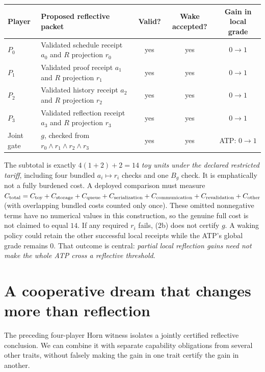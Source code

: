 \documentclass[11pt,letterpaper]{article}
\theoremstyle{definition}
\theoremstyle{plain}
\theoremstyle{definition}
\begin{document}
\begin{center}\small
\begin{tabularx}{\linewidth}{@{}lXccc@{}}\toprule
Player & Proposed reflective packet & Valid? & Wake accepted? & Gain in local grade\\\midrule
$P_0$ & Validated schedule receipt $a_0$ and $R$ projection $r_0$ & yes & yes & $0\to1$\\
$P_1$ & Validated proof receipt $a_1$ and $R$ projection $r_1$ & yes & yes & $0\to1$\\
$P_2$ & Validated history receipt $a_2$ and $R$ projection $r_2$ & yes & yes & $0\to1$\\
$P_3$ & Validated reflection receipt $a_3$ and $R$ projection $r_3$ & yes & yes & $0\to1$\\
Joint gate & $g$, checked from $r_0\wedge r_1\wedge r_2\wedge r_3$ & yes & yes & ATP: $0\to1$\\\bottomrule
\end{tabularx}
\end{center}

The subtotal is exactly $4(1+2)+2=14$ \emph{toy units under the declared restricted tariff}, including four bundled $a_i\mapsto r_i$ checks and one $B_g$ check. It is emphatically not a fully burdened cost. A deployed comparison must measure $C_{\rm total}=C_{\rm toy}+C_{\rm storage}+C_{\rm queue}+C_{\rm serialization}+C_{\rm communication}+C_{\rm revalidation}+C_{\rm other}$ (with overlapping bundled costs counted only once). These omitted nonnegative terms have no numerical values in this construction, so the genuine full cost is not claimed to equal $14$.  If any required $r_i$ fails, (2b) does not certify $g$. A waking policy could retain the other successful local receipts while the ATP's global grade remains 0. That outcome is central: \emph{partial local reflection gains need not make the whole ATP cross a reflective threshold}.


\section{A cooperative dream that changes more than reflection}\label{gl-first-W0-s15}
\label{sec:multi-witness}
The preceding four-player Horn witness isolates a jointly certified reflective conclusion. We can combine it with separate capability obligations from several other traits, without falsely making the gain in one trait certify the gain in another.
\end{document}
